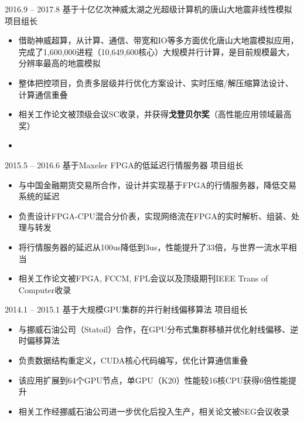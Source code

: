 \documentclass[localFont]{awesome-source-cv} %
\begin{document}
\begin{experiences}
\experience
{2016.9 -- 2017.8}   {基于十亿亿次神威太湖之光超级计算机的唐山大地震非线性模拟     \hspace{3.4cm} 项目组长}{}{}{}
{\begin{itemize}
	\item 借助神威超算，从计算、通信、带宽和IO等多方面优化唐山大地震模拟应用，完成了1,600,000进程（10,649,600核心）大规模并行计算，是目前规模最大，分辨率最高的地震模拟
	\item 整体把控项目，负责多层级并行优化方案设计、实时压缩/解压缩算法设计、计算通信重叠
	\item 相关工作论文被顶级会议SC收录，并获得\textbf{戈登贝尔奖}（高性能应用领域最高奖）
	\item \faGithub {}
\end{itemize}}{}

\emptySeparator
\experience
{2015.5 -- 2016.6}   {基于Maxeler FPGA的低延迟行情服务器     \hspace{7.2cm} 项目组长}{}{}{}
{\begin{itemize}
	\item 与中国金融期货交易所合作，设计并实现基于FPGA的行情服务器，降低交易系统的延迟
	\item 负责设计FPGA-CPU混合分价表，实现网络流在FPGA的实时解析、组装、处理与转发
	\item 将行情服务器的延迟从100us降低到3us，性能提升了33倍，与世界一流水平相当
	\item 相关工作论文被FPGA, FCCM, FPL会议以及顶级期刊IEEE Trans of Computer收录
\end{itemize}}{}

\emptySeparator
\experience
{2014.1 -- 2015.1}   {基于大规模GPU集群的并行射线偏移算法     \hspace{6.8cm} 项目组长}{}{}{}
{\begin{itemize}
	\item 与挪威石油公司（Statoil）合作，在GPU分布式集群移植并优化射线偏移、逆时偏移算法
	\item 负责数据结构重定义，CUDA核心代码编写，优化计算通信重叠
	\item 该应用扩展到64个GPU节点，单GPU（K20）性能较16核CPU获得6倍性能提升
	\item 相关工作经挪威石油公司进一步优化后投入生产，相关论文被SEG会议收录
\end{itemize}}{}

\end{experiences}
\end{document}
